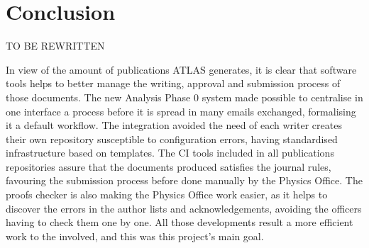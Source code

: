 
\section{Conclusion}
\label{sec:Conclusion}

TO BE REWRITTEN

In view of the amount of publications ATLAS generates, it is clear that software tools helps to better manage the writing, approval and submission process of those documents.
The new Analysis Phase 0 system made possible to centralise in one interface a process before it is spread in many emails exchanged, formalising it a default workflow.
The \gitlab integration avoided the need of each writer creates their own repository susceptible to configuration errors, having standardised infrastructure based on templates.
The \gitlab CI tools included in all publications repositories assure that the documents produced satisfies the journal rules, favouring the submission process before done manually by the Physics Office. 
The proofs checker is also making the Physics Office work easier,
as it helps to discover the errors in the author lists and acknowledgements, avoiding the officers having to check them one by one.
All those developments result a more efficient work to the involved, and this was this project's main goal.


